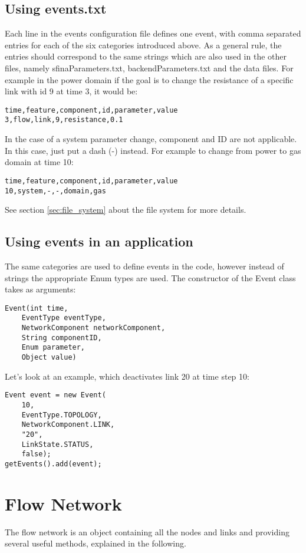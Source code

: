 \documentclass[11pt,fleqn]{book} %
\begin{document}
\subsection{Using events.txt}
Each line in the events configuration file defines one event, with comma separated entries for each of the six categories introduced above. As a general rule, the entries should correspond to the same strings which are also used in the other files, namely sfinaParameters.txt, backendParameters.txt and the data files. For example in the power domain if the goal is to change the resistance of a specific link with id 9 at time 3, it would be:
\begin{lstlisting}
time,feature,component,id,parameter,value
3,flow,link,9,resistance,0.1
\end{lstlisting}
In the case of a system parameter change, component and ID are not applicable. In this case, just put a dash (-) instead. For example to change from power to gas domain at time 10:
\begin{lstlisting}
time,feature,component,id,parameter,value
10,system,-,-,domain,gas
\end{lstlisting}
See section \ref{sec:file_system} about the file system for more details.

\subsection{Using events in an application}
The same categories are used to define events in the code, however instead of strings the appropriate Enum types are used. The constructor of the Event class takes as arguments:
\begin{lstlisting}
Event(int time, 
	EventType eventType, 
	NetworkComponent networkComponent, 
	String componentID, 
	Enum parameter, 
	Object value)
\end{lstlisting}
Let’s look at an example, which deactivates link 20 at time step 10:
\begin{lstlisting}
Event event = new Event(
	10,
	EventType.TOPOLOGY,
	NetworkComponent.LINK,
	"20",
	LinkState.STATUS,
	false);
getEvents().add(event);
\end{lstlisting}

\section{Flow Network}\label{sec:flow_net}
The flow network is an object containing all the nodes and links and providing several useful methods, explained in the following. 
\end{document}
